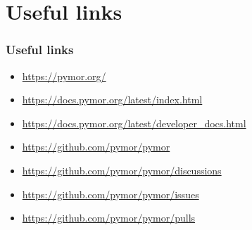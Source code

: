 \documentclass[%
]{beamer}
\begin{document}
\section*{Useful links}
\begin{frame}[fragile]
	\frametitle{Useful links}
	
	\begin{itemize}
		\item {} \href{https://pymor.org/}{https://pymor.org/}
		\item {} \href{https://docs.pymor.org/latest/index.html}{https://docs.pymor.org/latest/index.html}
		\item {} \href{https://docs.pymor.org/latest/developer_docs.html}{https://docs.pymor.org/latest/developer\_docs.html}
		\item {} \href{https://github.com/pymor/pymor}{https://github.com/pymor/pymor}
		\item {} \href{https://github.com/pymor/pymor/discussions}{https://github.com/pymor/pymor/discussions}
		\item {} \href{https://github.com/pymor/pymor/issues}{https://github.com/pymor/pymor/issues}
		\item {} \href{https://github.com/pymor/pymor/pulls}{https://github.com/pymor/pymor/pulls}
	\end{itemize}
\end{frame}
\end{document}
